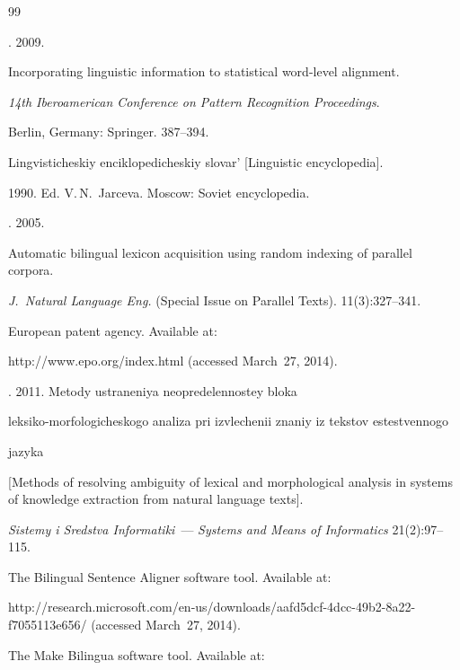 {{\begin{thebibliography}{99}


. 2009.


Incorporating linguistic information to statistical word-level alignment.


\textit{14th Iberoamerican Conference on Pattern Recognition Proceedings}.


Berlin, Germany: Springer. 387--394.




Lingvisticheskiy enciklopedicheskiy slovar' [Linguistic encyclopedia].


1990. Ed. V.\,N.~Jarceva. Moscow: Soviet encyclopedia.




. 2005.


Automatic bilingual lexicon acquisition using random indexing of parallel corpora.


\textit{J.~Natural Language Eng.} (Special Issue on Parallel Texts). 11(3):327--341.




European patent agency. Available at:


{\sf http://www.epo.org/index.html} (accessed March~27, 2014).




. 2011. Metody ustraneniya neopredelennostey bloka


leksiko-morfologicheskogo analiza pri izvlechenii znaniy iz tekstov estestvennogo


jazyka


 [Methods of resolving ambiguity of lexical and morphological analysis in systems of knowledge extraction from natural language texts].


\textit{Sistemy i Sredstva Informatiki}~--- \textit{Systems and Means of Informatics} 21(2):97--115.




The Bilingual Sentence Aligner software tool. Available at:


{\sf http://research.\linebreak microsoft.com/en-us/downloads/aafd5dcf-4dcc-49b2-8a22-f7055113e656/} (accessed March~27, 2014).




The Make Bilingua software tool. Available at:



\end{thebibliography}}}
